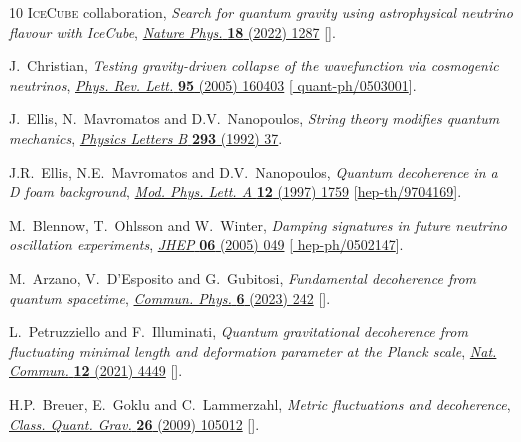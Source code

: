 \documentclass[11pt]{article}
\begin{document}
\begin{thebibliography}{10}
{\scshape IceCube} collaboration, \emph{{Search for quantum gravity using
  astrophysical neutrino flavour with IceCube}},
  \href{https://doi.org/10.1038/s41567-022-01762-1}{\emph{Nature Phys.}
  {\bfseries 18} (2022) 1287}
  [\href{https://arxiv.org/abs/2111.04654}{{}}].

J.~Christian, \emph{{Testing gravity-driven collapse of the wavefunction via
  cosmogenic neutrinos}},
  \href{https://doi.org/10.1103/PhysRevLett.95.160403}{\emph{Phys. Rev. Lett.}
  {\bfseries 95} (2005) 160403}
  [\href{https://arxiv.org/abs/quant-ph/0503001}{{\ttfamily
  quant-ph/0503001}}].

J.~Ellis, N.~Mavromatos and D.V.~Nanopoulos, \emph{String theory modifies
  quantum mechanics},
  \href{https://doi.org/https://doi.org/10.1016/0370-2693(92)91478-R}{\emph{Physics
  Letters B} {\bfseries 293} (1992) 37}.

J.R.~Ellis, N.E.~Mavromatos and D.V.~Nanopoulos, \emph{{Quantum decoherence in
  a D foam background}},
  \href{https://doi.org/10.1142/S0217732397001795}{\emph{Mod. Phys. Lett. A}
  {\bfseries 12} (1997) 1759}
  [\href{https://arxiv.org/abs/hep-th/9704169}{{\ttfamily hep-th/9704169}}].

M.~Blennow, T.~Ohlsson and W.~Winter, \emph{{Damping signatures in future
  neutrino oscillation experiments}},
  \href{https://doi.org/10.1088/1126-6708/2005/06/049}{\emph{JHEP} {\bfseries
  06} (2005) 049} [\href{https://arxiv.org/abs/hep-ph/0502147}{{\ttfamily
  hep-ph/0502147}}].

M.~Arzano, V.~D'Esposito and G.~Gubitosi, \emph{{Fundamental decoherence from
  quantum spacetime}},
  \href{https://doi.org/10.1038/s42005-023-01159-3}{\emph{Commun. Phys.}
  {\bfseries 6} (2023) 242} [\href{https://arxiv.org/abs/2208.14119}{{}}].

L.~Petruzziello and F.~Illuminati, \emph{{Quantum gravitational decoherence
  from fluctuating minimal length and deformation parameter at the Planck
  scale}}, \href{https://doi.org/10.1038/s41467-021-24711-7}{\emph{Nat.
  Commun.} {\bfseries 12} (2021) 4449}
  [\href{https://arxiv.org/abs/2011.01255}{{}}].

H.P.~Breuer, E.~Goklu and C.~Lammerzahl, \emph{{Metric fluctuations and
  decoherence}},
  \href{https://doi.org/10.1088/0264-9381/26/10/105012}{\emph{Class. Quant.
  Grav.} {\bfseries 26} (2009) 105012}
  [\href{https://arxiv.org/abs/0812.0420}{{}}].


\end{thebibliography}
\end{document}
